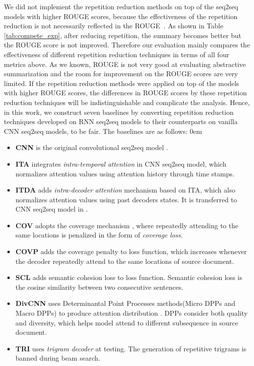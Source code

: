 \documentclass{nle}
\theoremstyle{definition}
\newcommand{\tabref}[1]{Table \ref{#1}}
\begin{document}
We did not implement the repetition reduction methods 
on top of the seq2seq models with higher ROUGE scores,
because the effectiveness of the repetition reduction is not necessarily
reflected in the ROUGE~\citep{SeeLM17, PaulusXS17, FanGA18}.
As shown in \tabref{tab:compete_exp}, 
after reducing repetition, the summary becomes better
but the ROUGE score is not improved. 
Therefore our evaluation mainly compares
the effectiveness of different repetition reduction techniques
in terms of all four metrics above.
As we known, ROUGE is not very good at evaluating abstractive summarization
and the room for improvement on the ROUGE scores are very limited.
If the repetition reduction methods 
were applied on top of the models with higher ROUGE scores, 
the differences in ROUGE scores by these repetition reduction techniques will be
indistinguishable and complicate the analysis. 
Hence, in this work, 
we construct seven baselines 
by converting
repetition reduction techniques developed on RNN seq2seq models to their
counterparts on vanilla CNN seq2seq models,
to be fair.
The baselines are as follows:
\itemsep0em
\begin{itemize}
	\item \textbf{CNN} is the original convolutional seq2seq model \citep{gehring2017convs2s}. 
	\item \textbf{ITA} integrates \textit{intra-temporal attention} \citep{NallapatiZSGX16} in CNN seq2seq model, which normalizes attention values using attention history through time stamps. 
	\item \textbf{ITDA} adds \textit{intra-decoder attention} mechanism \citep{PaulusXS17} based on ITA,
	which also normalizes attention values using past decoders states.
	It is transferred to CNN seq2seq model in \citep{FanGA18}.
	\item \textbf{COV} adopts the coverage mechanism \citep{SeeLM17}, where repeatedly
	attending to the same locations is penalized in the form of \textit{coverage loss}. 
	\item \textbf{COVP} adds the coverage penalty \citep{GehrmannDR18} to loss function,
	which increases whenever the decoder repeatedly attend to the same locations of source document.
	\item \textbf{SCL} adds semantic cohesion loss \citep{elikyilmazBHC18} to loss function.
	Semantic cohesion loss is the cosine similarity between two consecutive sentences.
	\item \textbf{DivCNN} uses Determinantal Point Processes methods(Micro DPPs and
	Macro DPPs) to produce attention distribution \citep{DivC2C19}. DPPs consider both quality and diversity, which helps model attend to different subsequence in source document.
	\item \textbf{TRI} uses \textit{trigram decoder} \citep{PaulusXS17} at testing. The generation of repetitive trigrams is banned during beam search.
\end{itemize}
\end{document}
